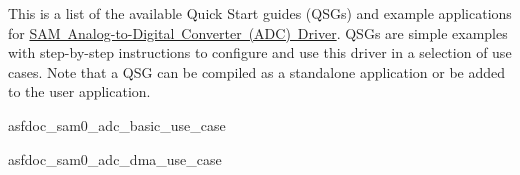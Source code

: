 This is a list of the available Quick Start guides (QSGs) and example applications for \mbox{\hyperlink{group__asfdoc__sam0__adc__group}{SAM Analog-\/to-\/\+Digital Converter (ADC) Driver}}. QSGs are simple examples with step-\/by-\/step instructions to configure and use this driver in a selection of use cases. Note that a QSG can be compiled as a standalone application or be added to the user application.


\begin{DoxyItemize}
\item asfdoc\+\_\+sam0\+\_\+adc\+\_\+basic\+\_\+use\+\_\+case 
\item asfdoc\+\_\+sam0\+\_\+adc\+\_\+dma\+\_\+use\+\_\+case 
\end{DoxyItemize}